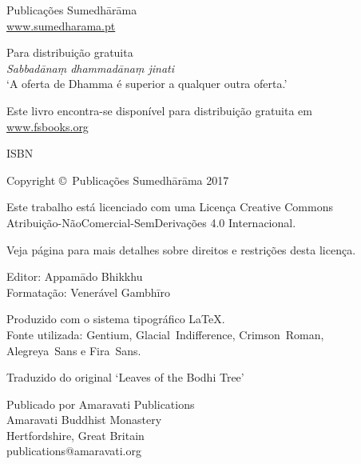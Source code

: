 \cleartoverso
\thispagestyle{empty}

{\copyrightsize
\centering
\setlength{\parindent}{0pt}%
\setlength{\parskip}{0.8\baselineskip}%

\thetitle

Publicações Sumedhārāma\\
\href{http://sumedharama.pt}{www.sumedharama.pt}

Para distribuição gratuita\\
\textit{Sabbadānaṃ dhammadānaṃ jinati}\\
‘A oferta de Dhamma é superior a qualquer outra oferta.’

Este livro encontra-se disponível para distribuição gratuita em\\
\href{http://fsbooks.org/}{www.fsbooks.org}

ISBN \theISBN

Copyright \copyright\ Publicações Sumedhārāma 2017

Este trabalho está licenciado com uma Licença Creative Commons\\
Atribuição-NãoComercial-SemDerivações 4.0 Internacional.

Veja página \pageref{copyright-details} para mais detalhes sobre direitos e restrições desta licença.

\theEditionInfo

Editor: Appamādo Bhikkhu\\
Formatação: Venerável Gambhīro

Produzido com o sistema tipográfico \LaTeX.\\
Fonte utilizada: Gentium, Glacial~Indifference, Crimson~Roman,\\
Alegreya~Sans e Fira~Sans.

\vfill

Traduzido do original `Leaves of the Bodhi Tree'

Publicado por Amaravati Publications\\
Amaravati Buddhist Monastery\\
Hertfordshire, Great Britain\\
publications@amaravati.org

}
